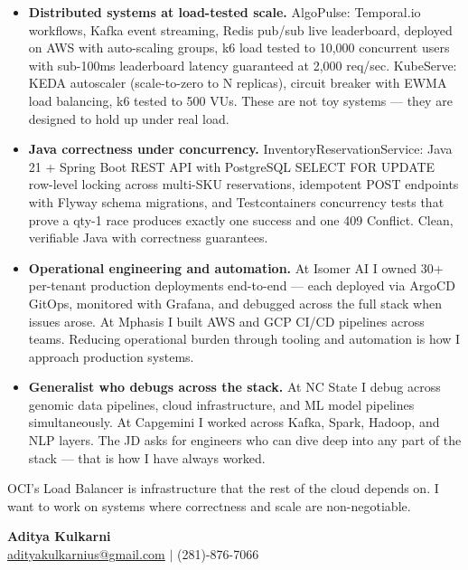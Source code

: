 \documentclass[11pt,letterpaper]{article}
\begin{document}
\begin{itemize}
  \item[\faAngleRight] \textbf{Distributed systems at load-tested scale.} AlgoPulse: Temporal.io workflows, Kafka event streaming, Redis pub/sub live leaderboard, deployed on AWS with auto-scaling groups, k6 load tested to 10,000 concurrent users with sub-100ms leaderboard latency guaranteed at 2,000 req/sec. KubeServe: KEDA autoscaler (scale-to-zero to N replicas), circuit breaker with EWMA load balancing, k6 tested to 500 VUs. These are not toy systems --- they are designed to hold up under real load.

  \item[\faAngleRight] \textbf{Java correctness under concurrency.} InventoryReservationService: Java 21 + Spring Boot REST API with PostgreSQL SELECT FOR UPDATE row-level locking across multi-SKU reservations, idempotent POST endpoints with Flyway schema migrations, and Testcontainers concurrency tests that prove a qty-1 race produces exactly one success and one 409 Conflict. Clean, verifiable Java with correctness guarantees.

  \item[\faAngleRight] \textbf{Operational engineering and automation.} At Isomer AI I owned 30+ per-tenant production deployments end-to-end --- each deployed via ArgoCD GitOps, monitored with Grafana, and debugged across the full stack when issues arose. At Mphasis I built AWS and GCP CI/CD pipelines across teams. Reducing operational burden through tooling and automation is how I approach production systems.

  \item[\faAngleRight] \textbf{Generalist who debugs across the stack.} At NC State I debug across genomic data pipelines, cloud infrastructure, and ML model pipelines simultaneously. At Capgemini I worked across Kafka, Spark, Hadoop, and NLP layers. The JD asks for engineers who can dive deep into any part of the stack --- that is how I have always worked.
\end{itemize}

\vspace{8pt}

OCI's Load Balancer is infrastructure that the rest of the cloud depends on. I want to work on systems where correctness and scale are non-negotiable.

\vspace{12pt}

{\color{OracleRed} \textbf{Aditya Kulkarni}} \\
\href{mailto:adityakulkarnius@gmail.com}{adityakulkarnius@gmail.com} \quad $|$ \quad (281)-876-7066
\end{document}
